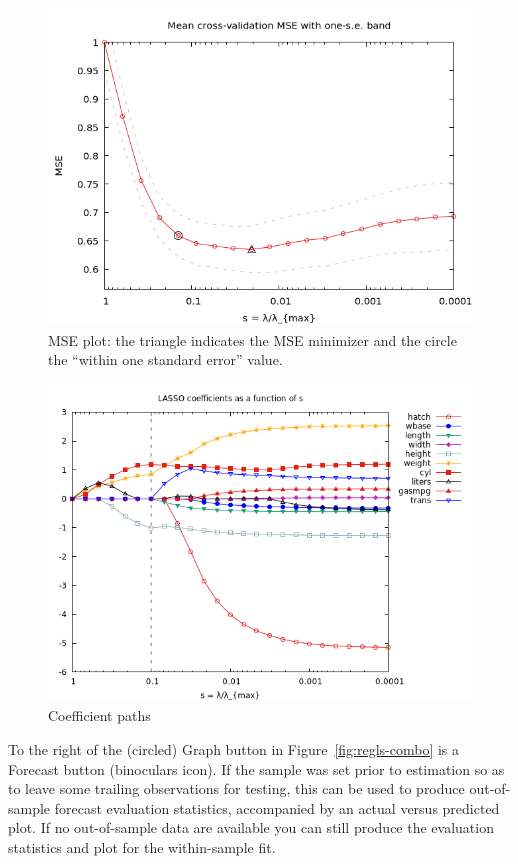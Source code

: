 \documentclass{article}
\begin{document}
\begin{figure}[htbp]
  \includegraphics[scale=0.6]{mse_plot}
  \caption{MSE plot: the triangle indicates the MSE minimizer and the
    circle the ``within one standard error'' value.}
  \label{fig:mse-plot}
\end{figure}

\begin{figure}[htbp]
  \centering
  \includegraphics[scale=0.6]{coeff_plot}
  \caption{Coefficient paths}
  \label{fig:coeff-plot}
\end{figure}

To the right of the (circled) Graph button in
Figure~\ref{fig:regls-combo} is a Forecast button (binoculars
icon). If the sample was set prior to estimation so as to leave some
trailing observations for testing, this can be used to produce
out-of-sample forecast evaluation statistics, accompanied by an actual
versus predicted plot. If no out-of-sample data are available you can
still produce the evaluation statistics and plot for the within-sample
fit.
\end{document}
